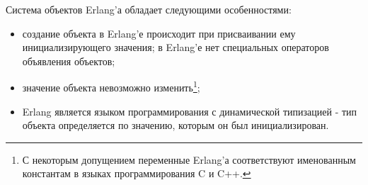 Система объектов Erlang'а обладает следующими особенностями:

\begin{itemize}

	\item создание объекта в Erlang'е происходит при присваивании ему инициализирующего значения; в Erlang'е нет специальных операторов объявления объектов;
	\item значение объекта невозможно изменить\footnote{С некоторым допущением переменные Erlang'а соответствуют именованным константам в языках программирования C и C++.};
	\item Erlang является языком программирования с динамической типизацией - тип объекта определяется по значению, которым он был инициализирован.

\end{itemize}

